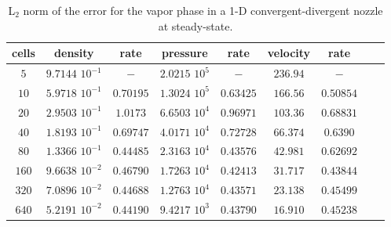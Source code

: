 \documentclass[preprint,10pt]{elsarticle}
\newcommand{\fig}[1]{Fig.~\ref{#1}}                      %
\begin{document}
\begin{table}[H]
\begin{center}
 \caption{\label{tbl:l2_norm_vap} L$_2$ norm of the error for the vapor phase in a 1-D convergent-divergent nozzle at steady-state.}
 \begin{tabular}{|c|c|c|c|c|c|c|c|c|}
 \hline
cells & density             & rate      & pressure          & rate      & velocity & rate       \\ \hline
$5$   & $9.7144$ $10^{-1}$  & $-$       & $2.0215$ $10^{5}$ & $-$       & $236.94$ & $-$        \\ \hline
$10$  & $5.9718$ $10^{-1}$  & $0.70195$ & $1.3024$ $10^{5}$ & $0.63425$ & $166.56$ & $0.50854$  \\ \hline
$20$  & $2.9503$ $10^{-1}$  & $1.0173$  & $6.6503$ $10^{4}$ & $0.96971$ & $103.36$ & $0.68831$  \\ \hline
$40$  & $1.8193$ $10^{-1}$  & $0.69747$ & $4.0171$ $10^{4}$ & $0.72728$ & $66.374$ & $0.6390$   \\ \hline
$80$  & $1.3366$ $10^{-1}$  & $0.44485$ & $2.3163$ $10^{4}$ & $0.43576$ & $42.981$ & $0.62692$  \\ \hline
$160$ & $9.6638$ $10^{-2}$  & $0.46790$ & $1.7263$ $10^{4}$ & $0.42413$ & $31.717$ & $0.43844$  \\ \hline
$320$ & $7.0896$ $10^{-2}$  & $0.44688$ & $1.2763$ $10^{4}$ & $0.43571$ & $23.138$ & $0.45499$  \\ \hline
$640$ & $5.2191$ $10^{-2}$  & $0.44190$ & $9.4217$ $10^{3}$ & $0.43790$ & $16.910$ & $0.45238$  \\ \hline
\end{tabular}
\end{center}
\nonumber
\end{table}
\end{document}
